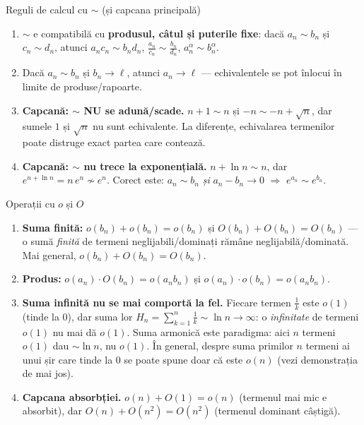 \begin{tehbox}{Reguli de calcul cu $\sim$ (și capcana principală)}
\begin{enumerate}[leftmargin=*, itemsep=1pt]
\item $\sim$ e compatibilă cu \textbf{produsul, câtul și puterile fixe}: dacă $a_n\sim b_n$ și $c_n\sim d_n$, atunci $a_nc_n\sim b_nd_n$, $\frac{a_n}{c_n}\sim\frac{b_n}{d_n}$, $a_n^{\alpha}\sim b_n^{\alpha}$.
\item Dacă $a_n\sim b_n$ și $b_n\to\ell$, atunci $a_n\to\ell$ --- echivalentele se pot înlocui în limite de produse/rapoarte.
\item \textbf{Capcană: $\sim$ NU se adună/scade.} $n+1\sim n$ și $-n\sim -n+\sqrt n$, dar sumele $1$ și $\sqrt n$ nu sunt echivalente. La diferențe, echivalarea termenilor poate distruge exact partea care contează.
\item \textbf{Capcană: $\sim$ nu trece la exponențială.} $n+\ln n\sim n$, dar $e^{n+\ln n}=n\,e^n\not\sim e^n$. Corect este: $a_n\sim b_n$ \emph{și} $a_n-b_n\to0$ $\Rightarrow$ $e^{a_n}\sim e^{b_n}$.
\end{enumerate}
\end{tehbox}

\begin{tehbox}{Operații cu $o$ și $O$}
\begin{enumerate}[leftmargin=*, itemsep=2pt]
\item \textbf{Suma finită:} $o(b_n)+o(b_n)=o(b_n)$ și $O(b_n)+O(b_n)=O(b_n)$ --- o sumă \emph{finită} de termeni neglijabili/dominați rămâne neglijabilă/dominată. Mai general, $o(b_n)+O(b_n)=O(b_n)$.
\item \textbf{Produs:} $o(a_n)\cdot O(b_n)=o(a_nb_n)$ și $o(a_n)\cdot o(b_n)=o(a_nb_n)$.
\item \textbf{Suma infinită nu se mai comportă la fel.} Fiecare termen $\frac{1}{k}$ este $o(1)$ (tinde la $0$), dar suma lor $H_n=\sum_{k=1}^n\frac1k\sim\ln n\to\infty$: o \emph{infinitate} de termeni $o(1)$ nu mai dă $o(1)$. Suma armonică este paradigma: aici $n$ termeni $o(1)$ dau $\sim\ln n$, nu $o(1)$. În general, despre suma primilor $n$ termeni ai unui șir care tinde la $0$ se poate spune doar că este $o(n)$ (vezi demonstrația de mai jos).
\item \textbf{Capcana absorbției.} $o(n)+O(1)=o(n)$ (termenul mai mic e absorbit), dar $O(n)+O(n^2)=O(n^2)$ (termenul dominant câștigă).
\end{enumerate}
\end{tehbox}


